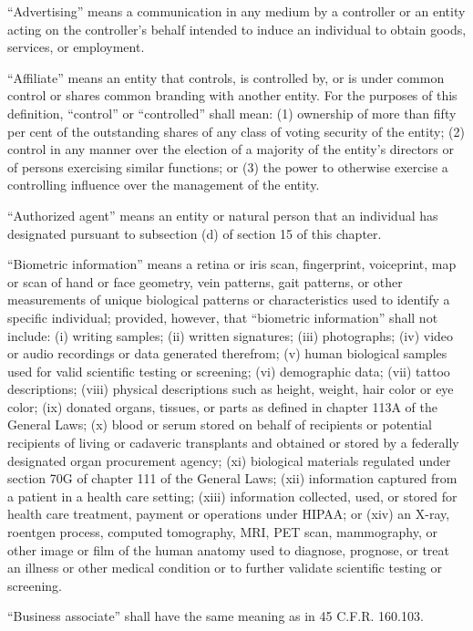 “Advertising” means a communication in any medium by a controller or an entity acting on the controller’s behalf intended to induce an individual to obtain goods, services, or employment.

“Affiliate” means an entity that controls, is controlled by, or is under common control or shares common branding with another entity. For the purposes of this definition, “control” or “controlled” shall mean: (1) ownership of more than fifty per cent of the outstanding shares of any class of voting security of the entity; (2) control in any manner over the election of a majority of the entity’s directors or of persons exercising similar functions; or (3) the power to otherwise exercise a controlling influence over the management of the entity.

“Authorized agent” means an entity or natural person that an individual has designated pursuant to subsection (d) of section 15 of this chapter.

“Biometric information” means a retina or iris scan, fingerprint, voiceprint, map or scan of hand or face geometry, vein patterns, gait patterns, or other measurements of unique biological patterns or characteristics used to identify a specific individual; provided, however, that “biometric information” shall not include: (i) writing samples; (ii) written signatures; (iii) photographs; (iv) video or audio recordings or data generated therefrom; (v) human biological samples used for valid scientific testing or screening; (vi) demographic data; (vii) tattoo descriptions; (viii) physical descriptions such as height, weight, hair color or eye color; (ix) donated organs, tissues, or parts as defined in chapter 113A of the General Laws; (x) blood or serum stored on behalf of recipients or potential recipients of living or cadaveric transplants and obtained or stored by a federally designated organ procurement agency; (xi) biological materials regulated under section 70G of chapter 111 of the General Laws; (xii) information captured from a patient in a health care setting; (xiii) information collected, used, or stored for health care treatment, payment or operations under HIPAA; or (xiv) an X-ray, roentgen process, computed tomography, MRI, PET scan, mammography, or other image or film of the human anatomy used to diagnose, prognose, or treat an illness or other medical condition or to further validate scientific testing or screening.

“Business associate” shall have the same meaning as in 45 C.F.R. 160.103.


